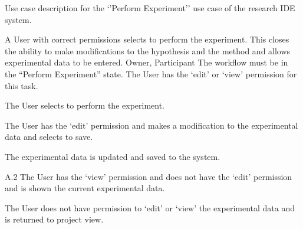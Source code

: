 \documentclass[document.tex]{subfiles}
\begin{document}
\begin{table}
  \centering
  \caption{Use case description for the `'Perform Experiment'' use case of the research IDE system.}
  \label{tbl:use-case-perform-experiment}

  \begin{usecase}
    A User with correct permissions selects to perform the experiment. This closes the ability to make modifications to the hypothesis and the method  and allows experimental data to be entered.
    Owner, Participant
    The workflow must be in the “Perform Experiment” state. The User has the ‘edit’ or ‘view’ permission for this task.
    \ucnormal
    \begin{ucenum}
      \item The User selects to perform the experiment.
      \item The User has the ‘edit’ permission and makes a modification to the experimental data and selects to save.
      \item The experimental data is updated and saved to the system.
    \end{ucenum}
    \begin{ucenum}
      \item [A.2] The User has the ‘view’ permission and does not have the ‘edit’ permission and is shown the current experimental data.
    \end{ucenum}
    The User does not have permission to ‘edit’ or ‘view’ the experimental data and is returned to project view.
  \end{usecase}
\end{table}
\end{document}
